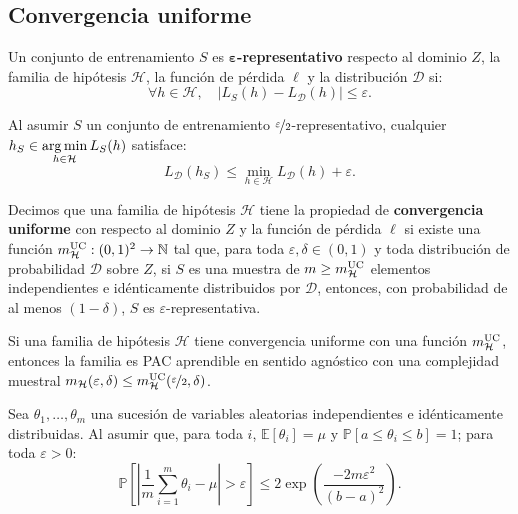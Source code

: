 \documentclass[8pt,a4paper]{extarticle}
\begin{document}
\begin{multicols}{3}
	\newpage

	\section{Convergencia uniforme}

	\begin{boxdef}
		Un conjunto de entrenamiento $S$ es \textbf{$\bm{\varepsilon}$-representativo} respecto al dominio $Z$, la familia de hipótesis $\mathcal{H}$, la función de pérdida $ \ell$ y la distribución $\mathcal{D}$ si:
		\[
			\forall h \in \mathcal{H}, \quad \left| L_S (h) - L_{\mathcal{D}} (h) \right| \le \varepsilon
			.\]
	\end{boxdef}

	\begin{boxlemma}[]
		Al asumir $S$ un conjunto de entrenamiento $\nicefrac{\varepsilon}{2}$-representativo, cualquier $\displaystyle h_{S} \in \operatorname*{\arg \min}_{h \in \mathcal{H}} L_{S} (h)$ satisface:
		\[
			L_{\mathcal{D}}(h_{S}) \le \min_{h \in \mathcal{H}} L_{\mathcal{D}} (h) + \varepsilon
			.\]
	\end{boxlemma}

	\begin{boxdef}
		Decimos que una familia de hipótesis $\mathcal{H}$ tiene la propiedad de \textbf{convergencia uniforme} con respecto al dominio $Z$ y la función de pérdida  $ \ell$ si existe una función $m_{\mathcal{H}}^{\text{\normalfont UC}} : (0,1)^2 \to \mathbb{N}$ tal que, para toda $\varepsilon, \delta \in (0,1)$ y toda distribución de probabilidad  $\mathcal{D}$ sobre $Z$, si $S$ es una muestra de  $m \ge m_{\mathcal{H}}^{\text{\normalfont UC}}$ elementos independientes e idénticamente distribuidos por $\mathcal{D}$, entonces, con probabilidad de al menos $(1 - \delta)$,  $S$ es $\varepsilon$-representativa.
	\end{boxdef}

	\begin{boxcor}[]
		Si una familia de hipótesis $\mathcal{H}$ tiene convergencia uniforme con una función $m_{\mathcal{H}}^{\text{\normalfont UC}}$, entonces la familia es PAC aprendible en sentido agnóstico con una complejidad muestral $m_{\mathcal{H}} (\varepsilon, \delta) \le m_{\mathcal{H}}^{\text{\normalfont UC}} (\nicefrac{\varepsilon}{2}, \delta)$.
	\end{boxcor}

	\begin{boxlemma}
		Sea $\theta_1, \ldots, \theta_m$ una sucesión de variables aleatorias independientes e idénticamente distribuidas. Al asumir que, para toda $i$, $\mathbb{E}[\theta_i] = \mu$ y $\mathbb{P}[a \le \theta_i \le b] = 1$; para toda $\varepsilon > 0$:
		\[
			\mathbb{P} \left[ \left| \frac{1}{m} \sum_{i = 1}^{m} \theta_i - \mu \right| > \varepsilon \right] \le 2 \exp \left( \frac{-2m \varepsilon^2}{(b - a)^2} \right)
			.\]
	\end{boxlemma}


\end{multicols}
\end{document}
